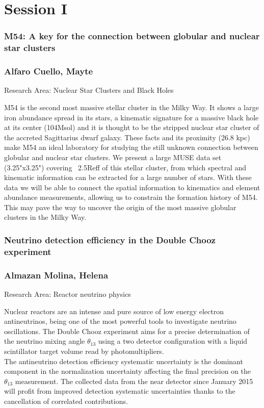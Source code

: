 \chapter*{Session I}
\subsection*{\centering \large M54: A key for the connection between globular and nuclear star clusters}
\subsection*{\centering \normalsize Alfaro Cuello, Mayte}
Research Area: Nuclear Star Clusters and Black Holes\newline

\noindent M54 is the second most massive stellar cluster in the Milky Way. It shows
a large iron abundance spread in its stars, a kinematic signature for a
massive black hole at its center (104Msol) and it is thought to be the
stripped nuclear star cluster of the accreted Sagittarius dwarf galaxy.
These facts and its proximity (26.8 kpc) make M54 an ideal laboratory for
studying the still unknown connection between globular and nuclear star
clusters. We present a large MUSE data set (3.25"x3.25") covering ~2.5Reff
of this stellar cluster, from which spectral and kinematic information can
be extracted for a large number of stars. With these data we will be able
to connect the spatial information to kinematics and element abundance
measurements, allowing us to constrain the formation history of M54. This
may pave the way to uncover the origin of the most massive globular
clusters in the Milky Way.
\subsection*{\centering \large Neutrino detection efficiency in the Double Chooz experiment}
\subsection*{\centering \normalsize Almazan Molina, Helena}
Research Area: Reactor neutrino physics \newline

\noindent Nuclear reactors are an intense and pure source of low energy electron antineutrinos, being one of the most powerful tools to investigate neutrino oscillations. The Double Chooz experiment aims for a precise determination of the neutrino mixing angle $\theta_{13}$ using a two detector configuration with a liquid scintillator target volume read by photomultipliers. \\The antineutrino detection efficiency systematic uncertainty is the dominant component in the normalization uncertainty affecting the final precision on the $\theta_{13}$ measurement. The collected data from the near detector since January 2015 will profit from improved detection systematic uncertainties thanks to the cancellation of correlated contributions.
\newpage
